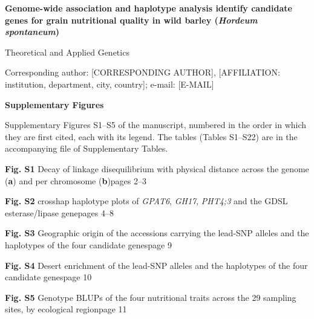 \documentclass[10pt]{article}
\begin{document}
{\large\bfseries Genome-wide association and haplotype analysis identify candidate genes for grain nutritional quality in wild barley (\textit{Hordeum spontaneum})\par}\vspace{3mm}
Theoretical and Applied Genetics\par
[AUTHOR NAMES]\par
Corresponding author: [CORRESPONDING AUTHOR], [AFFILIATION: institution, department, city, country]; e-mail: [E-MAIL]\par\vspace{10mm}
{\large\bfseries Supplementary Figures\par}\vspace{3mm}
Supplementary Figures S1–S5 of the manuscript, numbered in the order in which they are first cited, each with its legend. The tables (Tables S1–S22) are in the accompanying file of Supplementary Tables.\par\vspace{4mm}
{\small \textbf{Fig. S1} Decay of linkage disequilibrium with physical distance across the genome (\textbf{a}) and per chromosome (\textbf{b})\hfill pages 2–3

\textbf{Fig. S2} crosshap haplotype plots of \textit{GPAT6}, \textit{GH17}, \textit{PHT4;3} and the GDSL esterase/lipase gene\hfill pages 4–8

\textbf{Fig. S3} Geographic origin of the accessions carrying the lead-SNP alleles and the haplotypes of the four candidate genes\hfill page 9

\textbf{Fig. S4} Desert enrichment of the lead-SNP alleles and the haplotypes of the four candidate genes\hfill page 10

\textbf{Fig. S5} Genotype BLUPs of the four nutritional traits across the 29 sampling sites, by ecological region\hfill page 11\par}
\end{document}
